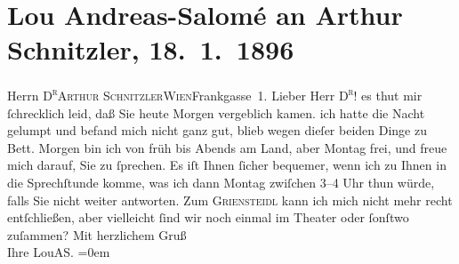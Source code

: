 

         \renewcommand{\erwaehnteOrte}{Orte: Café Griensteidl, Frankgasse 1, I., Innere Stadt, IX., Alsergrund, Wien}
         \renewcommand{\erwaehnteWerke}{}
               \section[Lou Andreas-Salomé an Arthur Schnitzler, 18. 1. 1896]{ Lou Andreas-Salomé an Arthur Schnitzler, 18. 1. 1896}\nopagebreak{}\rehead{ }\begin{ledgroupsized}[t]{13cm}\normalsize\beginnumbering \toendnotes[C]{\smallbreak\pagebreak[2]} 
\pstart{}{\pb}Herrn \textsc{D\textsuperscript{r}}\pend{}\pstart{}\textsc{Arthur Schnitzler}\pend{}\pstart{}\textsc{Wien}\pend{}\pstart{}Frankgasse 1. \pend{}{\bigskip}\pstart
           \noindent{}{\pb}Lieber Herr \textsc{D\textsuperscript{r}}! es thut mir ſchrecklich leid, daß Sie heute Morgen vergeblich
               kamen. ich hatte die Nacht gelumpt und befand mich nicht ganz gut, blieb wegen dieſer
               beiden Dinge zu Bett. Morgen bin ich von früh bis Abends am Land, aber Montag frei,
               und freue mich darauf, Sie zu ſprechen. Es iſt Ihnen ſicher bequemer, wenn ich zu
               Ihnen in die Sprechſtunde komme, was ich dann Montag zwiſchen 3–4 Uhr
               thun würde, falls Sie nicht weiter antworten. Zum \textsc{Griensteidl} kann ich mich nicht mehr recht entſchließen, aber vielleicht ſind wir noch
               einmal im Theater oder ſonſtwo zuſammen?\pend
           \pstart
           Mit herzlichem Gruß{\\[\baselineskip]}Ihre \spacefill\mbox{LouAS.}\pend
           \leftskip=0em{}
         
         \endnumbering{}\end{ledgroupsized}  \newcommand{\dateiname}{L00529}\newcommand{\titel}{Lou Andreas-Salomé an Arthur Schnitzler, 18. 1. 1896}\newcommand{\editorInnen}{Martin Anton Müller und Gerd-Hermann Susen}
      